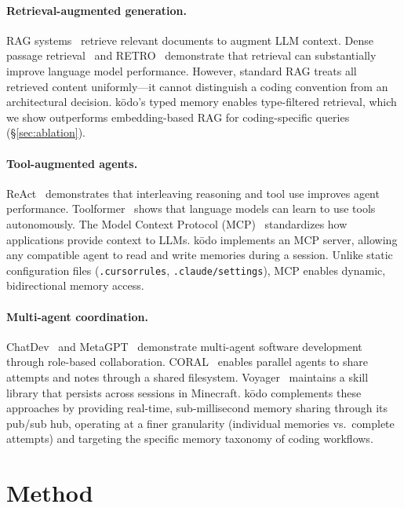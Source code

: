 \documentclass{article}
\begin{document}
\paragraph{Retrieval-augmented generation.}
RAG systems~\cite{lewis2020rag} retrieve relevant documents to augment LLM context. Dense passage retrieval~\cite{karpukhin2020dense} and RETRO~\cite{borgeaud2022retro} demonstrate that retrieval can substantially improve language model performance. However, standard RAG treats all retrieved content uniformly---it cannot distinguish a coding convention from an architectural decision. k\=odo's typed memory enables type-filtered retrieval, which we show outperforms embedding-based RAG for coding-specific queries (\S\ref{sec:ablation}).

\paragraph{Tool-augmented agents.}
ReAct~\cite{yao2023react} demonstrates that interleaving reasoning and tool use improves agent performance. Toolformer~\cite{schick2023toolformer} shows that language models can learn to use tools autonomously. The Model Context Protocol (MCP)~\cite{mcp2024} standardizes how applications provide context to LLMs. k\=odo implements an MCP server, allowing any compatible agent to read and write memories during a session. Unlike static configuration files (\texttt{.cursorrules}, \texttt{.claude/settings}), MCP enables dynamic, bidirectional memory access.

\paragraph{Multi-agent coordination.}
ChatDev~\cite{qian2024chatdev} and MetaGPT~\cite{hong2024metagpt} demonstrate multi-agent software development through role-based collaboration. CORAL~\cite{coral2025} enables parallel agents to share attempts and notes through a shared filesystem. Voyager~\cite{wang2024voyager} maintains a skill library that persists across sessions in Minecraft. k\=odo complements these approaches by providing real-time, sub-millisecond memory sharing through its pub/sub hub, operating at a finer granularity (individual memories vs.\ complete attempts) and targeting the specific memory taxonomy of coding workflows.

\section{Method}
\label{sec:method}
\end{document}
